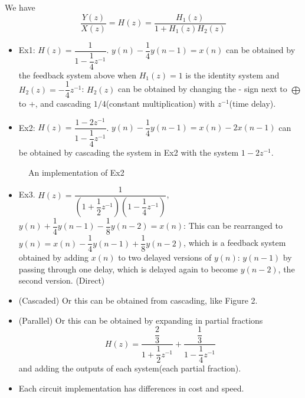 \documentclass{article}
\begin{document}
We have \[\frac{Y(z)}{X(z)}=H(z)=\frac{H_1(z)}{1+H_1(z)H_2(z)}\]
\begin{itemize}
    \item Ex1: $H(z)=\dfrac{1}{1-\dfrac{1}{4}z^{-1}}$. $y(n)-\dfrac{1}{4}y(n-1)=x(n)$ can be obtained by the feedback system above when $H_1(z)=1$ is the identity system and $H_2(z)=-\dfrac{1}{4}z^{-1}$: $H_2(z)$ can be obtained by changing the - sign next to $\bigoplus$ to +, and cascading $1/4$(constant multiplication) with $z^{-1}$(time delay).
    \item Ex2: $H(z)=\dfrac{1-2z^{-1}}{1-\dfrac{1}{4}z^{-1}}$. $y(n)-\dfrac{1}{4}y(n-1)=x(n)-2x(n-1)$ can be obtained by cascading the system in Ex2 with the system $1-2z^{-1}$.
\end{itemize}
\begin{figure}[htb]
\centering
{}
\caption{An implementation of Ex2}
\end{figure}
\begin{itemize}
    \item Ex3. $H(z)=\dfrac{1}{(1+\dfrac{1}{2}z^{-1})(1-\dfrac{1}{4}z^{-1})}$, $y(n)+\dfrac{1}{4}y(n-1)-\dfrac{1}{8}y(n-2)=x(n)$: This can be rearranged to $y(n)=x(n)-\dfrac{1}{4}y(n-1)+\dfrac{1}{8}y(n-2)$, which is a feedback system obtained by adding $x(n)$ to two delayed versions of $y(n)$: $y(n-1)$ by passing through one delay, which is delayed again to become $y(n-2)$, the second version. (Direct)
    \item (Cascaded) Or this can be obtained from cascading, like Figure 2.
    \item (Parallel) Or this can be obtained by expanding in partial fractions
    \[H(z)=\dfrac{\dfrac{2}{3}}{1+\dfrac{1}{2}z^{-1}}+\dfrac{\dfrac{1}{3}}{1-\dfrac{1}{4}z^{-1}}\] and adding the outputs of each system(each partial fraction).
    \item Each circuit implementation has differences in cost and speed.
\end{itemize}
\end{document}
